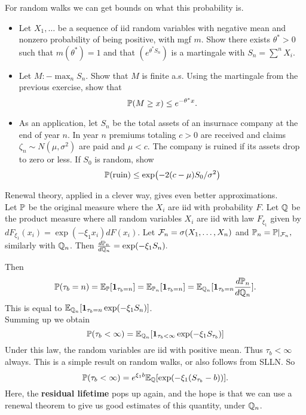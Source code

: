 \documentclass[12pt]{article}
\begin{document}
\begin{exercise}[Chatterjee's 310B 2022]
For random walks we can get bounds on what this probability is. 
\begin{itemize}
    \item Let $X_1,\dots$ be a sequence of iid random variables with negative mean and nonzero probability of being positive, with mgf $m$. Show there exists $\theta^* > 0$ such that $m(\theta^*) = 1$ and that $(e^{\theta^* S_n})$ is a martingale with $S_n = \sum^n X_i$.
    \item Let $M :- \max_n S_n$. Show that $M$ is finite a.s. Using the martingale from the previous exercise, show that 
    \[
    \mathbb{P}(M \geq x) \leq e^{-\theta^* x}.
    \]
    \item As an application, let $S_n$ be the total assets of an insurnace company at the end of year $n$. In year $n$ premiums totaling $c > 0$ are received and claims $\zeta_n \sim N(\mu,\sigma^2)$ are paid and $\mu < c.$ The company is ruined if its assets drop to zero or less. If $S_0$ is random, show
    \[
    \mathbb{P}(\text{ruin}) \leq \exp(-2(c-\mu)S_0/\sigma^2)
    \]
\end{itemize}
\end{exercise}

Renewal theory, applied in a clever way, gives even better approximations. \\

Let $\mathbb{P}$ be the original measure where the $X_i$ are iid with probability $F$. Let $\mathbb{Q}$ be the product measure where all random variables $X_i$ are iid with law $F_{\xi_1}$ given by $dF_{\xi_1}(x_i) = \exp(-\xi_1 x_i) dF(x_i)$. Let $\mathcal{F}_n = \sigma(X_1,\dots,X_n)$ and $\mathbb{P}_n = \mathbb{P}|_{\mathcal{F}_n}, $ similarly with $\mathbb{Q}_n$. Then $\frac{d\mathbb{P}_n}{d\mathbb{Q}_n} = \exp(-\xi_1 S_n).$

Then
\[
\mathbb{P}(\tau_b = n) = \mathbb{E}_{\mathbb{P}}[\mathbf{1}_{\tau_b = n}] = \mathbb{E}_{\mathbb{P}_n}[\mathbf{1}_{\tau_b = n}]  =  \mathbb{E}_{\mathbb{Q}_n}[\mathbf{1}_{\tau_b = n}\frac{d\mathbb{P}_n}{d\mathbb{Q}_n}].
\]
This is equal to $\mathbb{E}_{\mathbb{Q}_n}[\mathbf{1}_{\tau_b = n}\exp(-\xi_1 S_n)]$.\\

Summing up we obtain
\[
\mathbb{P}(\tau_b < \infty) = \mathbb{E}_{\mathbb{Q}_n}[\mathbf{1}_{\tau_b < \infty}\exp(-\xi_1 S_{\tau_b})]
\]
Under this law, the random variables are iid with positive mean. Thus $\tau_b < \infty$ always. This is a simple result on random walks, or also follows from SLLN. So
\[
\mathbb{P}(\tau_b < \infty) =  e^{\xi_1 b }\mathbb{E}_{\mathbb{Q}}[\exp(-\xi_1( S_{\tau_b} - b))].
\]
Here, the \textbf{residual lifetime} pops up again, and the hope is that we can use a renewal theorem to give us good estimates of this quantity, under $\mathbb{Q}_n$. \\
\end{document}
